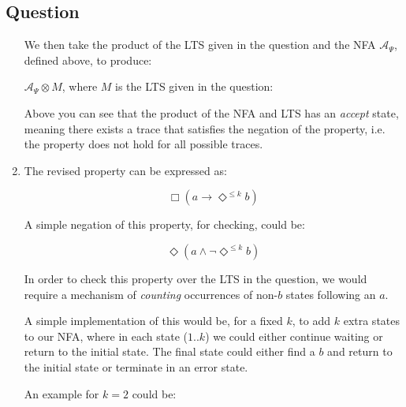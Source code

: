 \documentclass[12pt,a4paper]{article}
\newcounter{question}\setcounter{question}{1}
\newenvironment{question}{%
\subsection*{Question \arabic{question}}}%
{\stepcounter{question}}
\begin{document}
\begin{question}
\begin{enumerate}[label= (\alph*)]
          We then take the product of the LTS given in the question and the NFA $\mathcal{A}_{\Psi}$, defined above, to produce:

          $\mathcal{A}_{\Psi} \otimes M$, where $M$ is the LTS given in the question:


          \begin{center}
          \end{center}

          Above you can see that the product of the NFA and LTS has an \textit{accept} state, meaning there exists a trace that satisfies the negation of the property, i.e. the property does not hold for all possible traces.

    \item
          The revised property can be expressed as:

          \[
            \Box (a \rightarrow \Diamond^{\leq k} b)
          \]

          A simple negation of this property, for checking, could be:

          \[
          \Diamond (a \wedge \neg \Diamond^{\leq k}b)
          \]


          In order to check this property over the LTS in the question, we would require a mechanism of \textit{counting} occurrences of non-$b$ states following an $a$.

          A simple implementation of this would be, for a fixed $k$, to add $k$ extra states to our NFA, where in each state ($1..k$) we could either continue waiting or return to the initial state. The final state could either find a $b$ and return to the initial state or terminate in an error state.

          An example for $k=2$ could be:


          \begin{center}
\end{center}
\end{enumerate}
\end{question}
\end{document}
